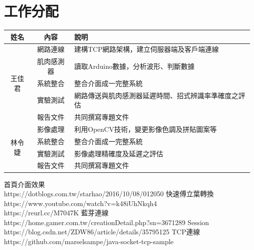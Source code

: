 \documentclass[12pt]{article}  %
\theoremstyle{plain}
\begin{document}
\section{工作分配}
\begin{tabular}{|c|c|p{9.5cm}|}
\hline
\cellcolor[HTML]{B2BEB5}姓名 & \cellcolor[HTML]{B2BEB5}內容 & \cellcolor[HTML]{B2BEB5}說明\\
\hline\hline
\multirow{5}{*}{王佳君} & 網路連線 & 建構TCP網路架構，建立伺服器端及客戶端連線 \\
\cline{2-3}
\multirow{5}{*}{} & 肌肉感測器 & 讀取Arduino數據，分析波形、判斷數據 \\
\cline{2-3}
\multirow{5}{*}{} & 系統整合 & 整合介面成一完整系統 \\
\cline{2-3}
\multirow{5}{*}{} & 實驗測試 & 網路傳送與肌肉感測器延遲時間、招式辨識率準確度之評估\\
\cline{2-3}
\multirow{5}{*}{} & 報告文件 & 共同撰寫專題文件 \\
\hline
\multirow{4}{*}{林令婕} & 影像處理 & 利用OpenCV技術，變更影像色調及拼貼圖案等 \\
\cline{2-3}
\multirow{4}{*}{} & 系統整合 & 整合介面成一完整系統 \\
\cline{2-3}
\multirow{4}{*}{} & 實驗測試 & 影像處理精確度及延遲之評估 \\
\cline{2-3}
\multirow{4}{*}{} & 報告文件 & 共同撰寫專題文件 \\
\hline
\end{tabular}
\newpage




\begin{thebibliography}{99}  %
首頁介面效果\\
https://dotblogs.com.tw/starhao/2016/10/08/012050
快速傅立葉轉換\\
https://www.youtube.com/watch?v=k48iUhNkqh4 \\
https://reurl.cc/M7047K
藍芽連線\\
https://home.gamer.com.tw/creationDetail.php?sn=3671289
Session\\
https://blog.csdn.net/ZDW86/article/details/35795125
TCP連線\\
https://github.com/marselsampe/java-socket-tcp-sample
\end{thebibliography}
\newpage
\end{document}
